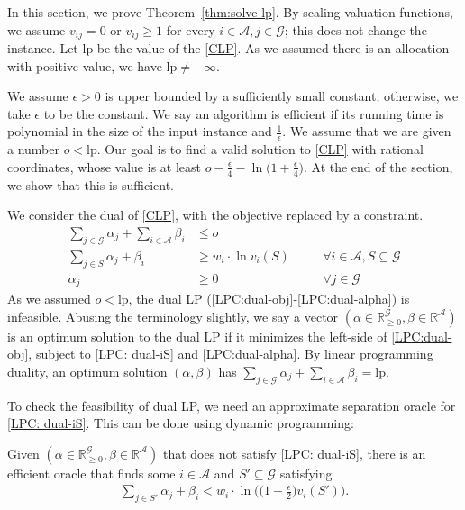 \documentclass{theoretics}
\newcommand\calA{{\mathcal{A}}}
\newcommand\calG{{\mathcal{G}}}
\newcommand{\R}{{\mathbb{R}}}
\newcommand{\lp}{\mathrm{lp}}
\begin{document}
    In this section, we prove Theorem~\ref{thm:solve-lp}. By scaling valuation functions, we assume $v_{ij} = 0$ or $v_{ij} \geq 1$ for every $i \in \calA, j \in \calG$; this does not change the instance. Let $\lp$ be the value of the \eqref{CLP}. As we assumed there is an allocation with positive value, we have $\lp \neq -\infty$. 
    
    
    We assume $\epsilon > 0$ is upper bounded by a sufficiently small constant; otherwise, we take $\epsilon$ to be the constant. We say an algorithm is efficient if its running time is polynomial in the size of the input instance and $\frac1\epsilon$. We assume that we are given a number $o < \lp$. Our goal is to find a valid solution to \eqref{CLP} with rational coordinates, whose value is at least $o - \frac\epsilon 4 - \ln\big(1 + \frac\epsilon 4\big)$. At the end of the section, we show that this is sufficient. \medskip

    We consider the dual of \eqref{CLP}, with the objective replaced by a constraint. 
    \begin{align}
        \sum_{j \in \calG}\alpha_j + \sum_{i \in \calA} \beta_i &\leq o \label{LPC:dual-obj}\\
        \sum_{j \in S} \alpha_j + \beta_i &\geq w_i \cdot \ln v_i(S) &\quad &\forall i \in \calA, S \subseteq \calG \label{LPC: dual-iS}\\
        \alpha_j &\geq 0 &\quad &\forall j \in \calG \label{LPC:dual-alpha} 
    \end{align}
    As we assumed $o < \lp$, the dual LP (\ref{LPC:dual-obj}-\ref{LPC:dual-alpha}) is infeasible. Abusing the terminology slightly, we say a vector $(\alpha \in \R_{\geq 0}^\calG, \beta \in \R^{\calA})$ is an optimum solution to the dual LP if it minimizes the left-side of \eqref{LPC:dual-obj}, subject to \eqref{LPC: dual-iS} and \eqref{LPC:dual-alpha}. By linear programming duality, an optimum solution $(\alpha, \beta)$ has $\sum_{j \in \calG}\alpha_j + \sum_{i \in \calA} \beta_i=\lp$. 

    To check the feasibility of dual LP, we need an approximate separation oracle for \eqref{LPC: dual-iS}. This can be done using dynamic programming: 
    \begin{lemma}
        \label{lemma:oracle}
        Given $(\alpha \in \R_{\geq 0}^\calG, \beta \in \R^\calA)$ that does not satisfy \eqref{LPC: dual-iS}, there is an efficient oracle that finds some $i \in \calA$ and $S' \subseteq \calG$ satisfying 
    \begin{align}
        \sum_{j \in S'} \alpha_j + \beta_i < w_i \cdot \ln \Big(\big(1+\frac\epsilon2\big)v_i(S')\Big). \label{inequ:S'}
    \end{align}
  
    \end{lemma}
\end{document}
